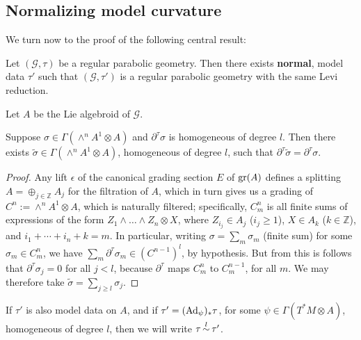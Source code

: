 \documentclass[leqno,12pt]{amsart} %
\begin{document}
\subsection{Normalizing model curvature}\label{normalization_}

We turn now to the proof of the following central result:

\begin{theorem}[Normalization]
  Let $({\mathcal G}, \tau)$ be a regular parabolic
  geometry. Then there exists {\bfseries normal}, model data $\tau'$ such that
  $({\mathcal G} , \tau')$ is a regular parabolic geometry with the same Levi reduction.
\end{theorem}

Let $A$ be the Lie algebroid of ${\mathcal G} $.
\begin{lemmaA}
  Suppose $\sigma \in \Gamma(\wedge^nA^1 \otimes A)$ and $\partial^\tau \sigma $ is
  homogeneous of degree $l$. Then there exists
  $\tilde \sigma \in \Gamma(\wedge^n A^1 \otimes A)$, homogeneous of degree $l$, such that
  $\partial^\tau \tilde \sigma = \partial^\tau \sigma $.
\end{lemmaA}
\begin{proof}
  Any lift $\epsilon $ of the canonical grading section $E$ of $\operatorname{\operatorname{gr}}(A)$ defines a
  splitting $A = \oplus_{j \in {\mathbb Z}}A_j$ for the filtration of $A$, which in turn
  gives us a grading of $C^n := \wedge^n A^1 \otimes A$, which is naturally filtered;
  specifically, $C^n_m$ is all finite sums of expressions of the form
  $Z_1\wedge \ldots \wedge Z_n \otimes  X$, where $Z_{i_j} \in A_j$ ($i_j \ge 1$), $X \in A_k$
  ($k \in {\mathbb Z}$), and $i_1+ \cdots + i_n + k = m$. In particular, writing
  $\sigma = \sum_m \sigma_m$ (finite sum) for some $\sigma_m \in C^n_m$, we have
  $\sum_m\partial^\tau \sigma_m \in (C^{n-1})^l$, by hypothesis. But from this is follows
  that $\partial^\tau \sigma_j=0$ for all $j< l$, because $\partial^\tau $ maps $C^n_m$ to
  $C^{n-1}_m$, for all $m$. We may therefore take
  $\tilde \sigma = \sum_{j\ge l} \sigma_j$.
\end{proof}
\begin{notation}
  If $\tau'$ is also model data on $A$, and if $\tau'=(\operatorname{Ad}_\psi)_*\tau $, for some
  $\psi \in \Gamma(T^*\!M \otimes A)$, homogeneous of degree $l$, then we will write
  $\tau{\overset{l}{\,\sim\,}} \tau' $.
\end{notation}
\end{document}
